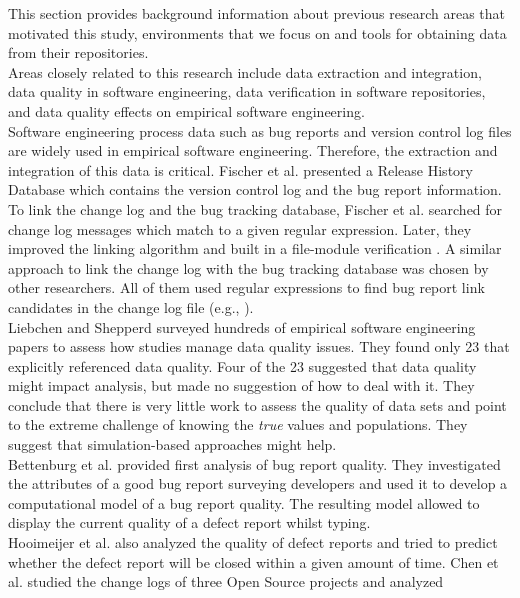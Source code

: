 \documentclass[ifip]{svmult}
\begin{document}
This section provides background information about previous research areas that motivated this study, 
environments that we focus on and tools for obtaining data from their repositories. 
\\
Areas closely related to this research include data extraction and integration, data quality 
in software engineering, 
data verification in software repositories, and data quality effects on empirical software 
engineering.
\\
Software engineering process data such as bug reports and
version control log files are widely used in empirical software
engineering. Therefore, the extraction and integration of this data is critical.
Fischer et al. \cite{con0} presented a Release History Database which contains 
the version control log and the bug report information. To link the change log and 
the bug tracking database, Fischer et al. searched for change log messages which 
match to a given regular expression. Later, they improved the linking algorithm and 
built in a file-module verification \cite{con9}. A similar approach to link the 
change log with the bug tracking database was chosen by other researchers. All of 
them used regular expressions to find bug report link candidates in the change log 
file (e.g., \cite{con10, con6, con11, con12, con13}).
\\
Liebchen and Shepperd \cite{con14} surveyed hundreds of empirical software engineering 
papers to assess how studies manage data quality issues. They found only 23 that 
explicitly referenced data quality. Four of the 23 suggested that data quality 
might impact analysis, but made no suggestion of how to deal with it. They conclude that 
there is very little work to assess the quality of data sets and point to the extreme 
challenge of knowing the \textit{true} values and populations. They suggest that 
simulation-based approaches might help.
\\
Bettenburg et al. \cite{con15, con16, con17} provided first analysis of bug report quality. 
They investigated the attributes of a good bug report surveying developers and used it to 
develop a computational model of a bug report quality. The resulting model allowed to 
display the current quality of a defect report whilst typing.
\\
Hooimeijer et al. \cite{con18} also analyzed the quality of defect reports and tried to 
predict whether the defect report will be closed within a given amount of time.
Chen et al. \cite{con19} studied the change logs of three Open Source projects and analyzed 
\end{document}
